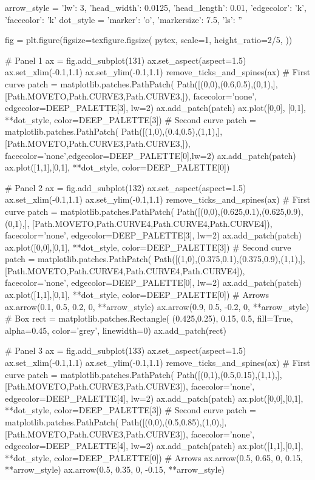 \begin{pycode}[chapter1]
arrow_style = {
    'lw': 3,
    'head_width': 0.0125,
    'head_length': 0.01,
    'edgecolor': 'k',
    'facecolor': 'k'
}
dot_style = { 'marker': 'o', 'markersize': 7.5, 'ls': ''}

fig = plt.figure(figsize=texfigure.figsize(
    pytex,
    scale=1,
    height_ratio=2/5,
))

# Panel 1
ax = fig.add_subplot(131)
ax.set_aspect(aspect=1.5)
ax.set_xlim(-0.1,1.1)
ax.set_ylim(-0.1,1.1)
remove_ticks_and_spines(ax)
# First curve
patch = matplotlib.patches.PathPatch(
    Path([(0,0),(0.6,0.5),(0,1),], [Path.MOVETO,Path.CURVE3,Path.CURVE3,]),
    facecolor='none', edgecolor=DEEP_PALETTE[3], lw=2)
ax.add_patch(patch)
ax.plot([0,0], [0,1], **dot_style, color=DEEP_PALETTE[3])
# Second curve
patch = matplotlib.patches.PathPatch(
    Path([(1,0),(0.4,0.5),(1,1),], [Path.MOVETO,Path.CURVE3,Path.CURVE3,]),
    facecolor='none',edgecolor=DEEP_PALETTE[0],lw=2)
ax.add_patch(patch)
ax.plot([1,1],[0,1], **dot_style, color=DEEP_PALETTE[0])

# Panel 2
ax = fig.add_subplot(132)
ax.set_aspect(aspect=1.5)
ax.set_xlim(-0.1,1.1)
ax.set_ylim(-0.1,1.1)
remove_ticks_and_spines(ax)
# First curve
patch = matplotlib.patches.PathPatch(
    Path([(0,0),(0.625,0.1),(0.625,0.9),(0,1),],
         [Path.MOVETO,Path.CURVE4,Path.CURVE4,Path.CURVE4]),
    facecolor='none', edgecolor=DEEP_PALETTE[3], lw=2)
ax.add_patch(patch)
ax.plot([0,0],[0,1], **dot_style, color=DEEP_PALETTE[3])
# Second curve
patch = matplotlib.patches.PathPatch(
    Path([(1,0),(0.375,0.1),(0.375,0.9),(1,1),],
         [Path.MOVETO,Path.CURVE4,Path.CURVE4,Path.CURVE4]),
    facecolor='none', edgecolor=DEEP_PALETTE[0], lw=2)
ax.add_patch(patch)
ax.plot([1,1],[0,1], **dot_style, color=DEEP_PALETTE[0])
# Arrows
ax.arrow(0.1, 0.5, 0.2, 0, **arrow_style)
ax.arrow(0.9, 0.5, -0.2, 0, **arrow_style)
# Box
rect = matplotlib.patches.Rectangle(
    (0.425,0.25), 0.15, 0.5,
    fill=True, alpha=0.45, color='grey', linewidth=0)
ax.add_patch(rect)

# Panel 3
ax = fig.add_subplot(133)
ax.set_aspect(aspect=1.5)
ax.set_xlim(-0.1,1.1)
ax.set_ylim(-0.1,1.1)
remove_ticks_and_spines(ax)
# First curve
patch = matplotlib.patches.PathPatch(
    Path([(0,1),(0.5,0.15),(1,1),], [Path.MOVETO,Path.CURVE3,Path.CURVE3]),
    facecolor='none', edgecolor=DEEP_PALETTE[4], lw=2)
ax.add_patch(patch)
ax.plot([0,0],[0,1], **dot_style, color=DEEP_PALETTE[3])
# Second curve
patch = matplotlib.patches.PathPatch(
    Path([(0,0),(0.5,0.85),(1,0),], [Path.MOVETO,Path.CURVE3,Path.CURVE3]),
    facecolor='none', edgecolor=DEEP_PALETTE[4], lw=2)
ax.add_patch(patch)
ax.plot([1,1],[0,1], **dot_style, color=DEEP_PALETTE[0])
# Arrows
ax.arrow(0.5, 0.65, 0, 0.15, **arrow_style)
ax.arrow(0.5, 0.35, 0, -0.15, **arrow_style)


\end{pycode}
